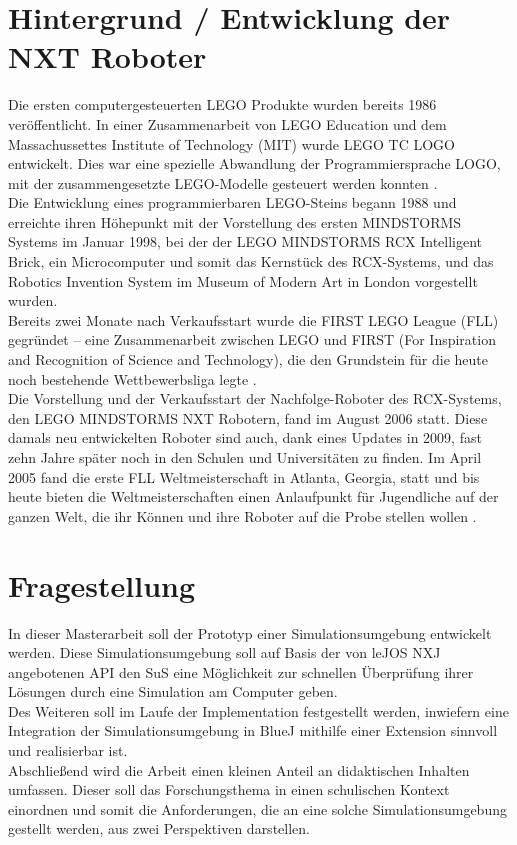 \documentclass[paper=a4, pagesize, DIV=calc, BCOR=12.5mm, twoside=off, onecolumn=on, open = any, titlepage =on, parskip =half-, headsepline = on, footsepline = on, chapterprefix = on, appendixprefix = off, fontsize = 12pt, numbers = noenddot, abstract = on]{scrbook}
\numberwithin{equation}{chapter}
\begin{document}
\par \singlespacing
\section*{Hintergrund / Entwicklung der NXT Roboter}
\onehalfspacing
Die ersten computergesteuerten LEGO Produkte wurden bereits 1986 veröffentlicht. In einer Zusammenarbeit von LEGO Education und dem Massachussettes Institute of Technology (MIT) wurde LEGO TC LOGO entwickelt. Dies war eine spezielle Abwandlung der Programmiersprache LOGO, mit der zusammengesetzte LEGO-Modelle gesteuert werden konnten \cite{rolling:14}.\\
Die Entwicklung eines programmierbaren LEGO-Steins begann 1988 und erreichte ihren Höhepunkt mit der Vorstellung des ersten MINDSTORMS Systems im Januar 1998, bei der der LEGO MINDSTORMS RCX Intelligent Brick, ein Microcomputer und somit das Kernstück des RCX-Systems, und das Robotics Invention System im Museum of Modern Art in London vorgestellt wurden.\\
Bereits zwei Monate nach Verkaufsstart wurde die FIRST LEGO League (FLL) gegründet -- eine Zusammenarbeit zwischen LEGO und FIRST (For Inspiration and Recognition of Science and Technology), die den Grundstein für die heute noch bestehende Wettbewerbsliga legte \cite{rolling:14}.\\
Die Vorstellung und der Verkaufsstart der Nachfolge-Roboter des RCX-Systems, den LEGO MINDSTORMS NXT Robotern, fand im August 2006 statt. Diese damals neu entwickelten Roboter sind auch, dank eines Updates in 2009, fast zehn Jahre später noch in den Schulen und Universitäten zu finden. Im April 2005 fand die erste FLL Weltmeisterschaft in Atlanta, Georgia, statt und bis heute bieten die Weltmeisterschaften einen Anlaufpunkt für Jugendliche auf der ganzen Welt, die ihr Können und ihre Roboter auf die Probe stellen wollen \cite{lego}.

\par \singlespacing
\section*{Fragestellung}
\onehalfspacing
In dieser Masterarbeit soll der Prototyp einer Simulationsumgebung entwickelt werden. Diese Simulationsumgebung soll auf Basis der von leJOS NXJ angebotenen API den SuS eine Möglichkeit zur schnellen Überprüfung ihrer Lösungen durch eine Simulation am Computer geben.\\
Des Weiteren soll im Laufe der Implementation festgestellt werden, inwiefern eine Integration der Simulationsumgebung in BlueJ mithilfe einer Extension sinnvoll und realisierbar ist.\\
Abschließend wird die Arbeit einen kleinen Anteil an didaktischen Inhalten umfassen. Dieser soll das Forschungsthema in einen schulischen Kontext einordnen und somit die Anforderungen, die an eine solche Simulationsumgebung gestellt werden, aus zwei Perspektiven darstellen.\\
\end{document}
